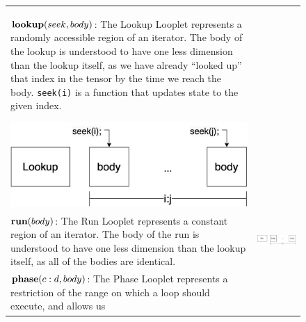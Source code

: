 \begin{figure}[ht]
\footnotesize
\begin{tabular} {|l|c|}
    \begin{minipage}[c]{0.65\linewidth}
        $\text{\textbf{lookup}}(seek, body)$: The Lookup Looplet represents a
        randomly accessible region of an iterator. The body of the lookup is
        understood to have one less dimension than the lookup itself, as we have
        already ``looked up'' that index in the tensor by the time we reach the
        body. \texttt{seek(i)} is a function that updates state to the given
        index.
    \end{minipage}%
    \begin{minipage}[c]{0.35\linewidth}
        \centering
        \includegraphics[scale=0.20]{Looplets-lookup.png}
    \end{minipage} \\
    \begin{minipage}[c]{0.65\linewidth}
        $\text{\textbf{run}}(body)$: The Run Looplet represents a constant
        region of an iterator. The body of the run is understood to have one
        less dimension than the lookup itself, as all of the bodies are
        identical.
    \end{minipage} &
    \begin{minipage}[c]{0.35\linewidth}
        \centering
        \includegraphics[scale=0.20]{Looplets-run.png}
    \end{minipage} \\
    \begin{minipage}[c]{0.65\linewidth}
        $\text{\textbf{phase}}(c:d, body)$: The Phase Looplet represents a
        restriction of the range on which a loop should execute, and allows us

\end{minipage}
\end{tabular}
\end{figure}
